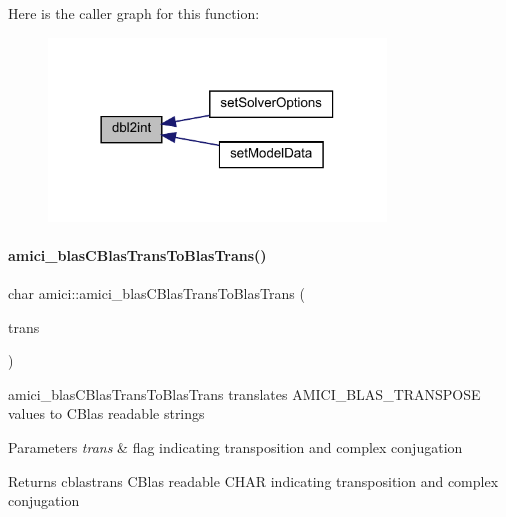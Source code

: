 Here is the caller graph for this function\+:
\nopagebreak
\begin{figure}[H]
\begin{center}
\leavevmode
\includegraphics[width=254pt]{namespaceamici_a204c68962100d0020a37392fef2e95e2_icgraph}
\end{center}
\end{figure}
\mbox{\label{namespaceamici_a800e4c3e12f712281a4355e765402260}} 
\paragraph{\texorpdfstring{amici\+\_\+blas\+C\+Blas\+Trans\+To\+Blas\+Trans()}{amici\_blasCBlasTransToBlasTrans()}}
{\footnotesize\ttfamily char amici\+::amici\+\_\+blas\+C\+Blas\+Trans\+To\+Blas\+Trans (\begin{DoxyParamCaption}\item[{\mbox{\hyperlink{namespaceamici_a0f0ec77c6c8f48d9c5cb50d54899afae}{B\+L\+A\+S\+Transpose}}}]{trans }\end{DoxyParamCaption})}

amici\+\_\+blas\+C\+Blas\+Trans\+To\+Blas\+Trans translates A\+M\+I\+C\+I\+\_\+\+B\+L\+A\+S\+\_\+\+T\+R\+A\+N\+S\+P\+O\+SE values to C\+Blas readable strings


\begin{DoxyParams}{Parameters}
{\em trans} & flag indicating transposition and complex conjugation\\
\hline
\end{DoxyParams}
\begin{DoxyReturn}{Returns}
cblastrans C\+Blas readable C\+H\+AR indicating transposition and complex conjugation 
\end{DoxyReturn}


